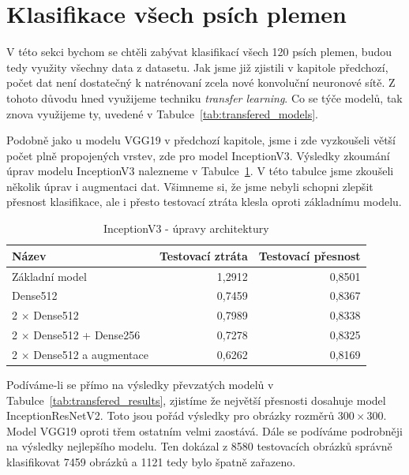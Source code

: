 \documentclass[a4paper,12pt]{article}
\begin{document}
\section{Klasifikace všech psích plemen}
V této sekci bychom se chtěli zabývat klasifikací všech 120 psích plemen, budou tedy využity všechny data z datasetu. Jak jsme již zjistili v kapitole předchozí, počet dat není dostatečný k natrénovaní zcela nové konvoluční neuronové sítě. Z tohoto důvodu hned využijeme techniku \emph{transfer learning}. Co se týče modelů, tak znova využijeme ty, uvedené v Tabulce~\ref{tab:transfered_models}.

Podobně jako u modelu VGG19 v předchozí kapitole, jsme i zde vyzkoušeli větší počet plně propojených vrstev, zde pro model InceptionV3. Výsledky zkoumání úprav modelu InceptionV3 nalezneme v Tabulce~\ref{tab:incv3tests}. V této tabulce jsme zkoušeli několik úprav i augmentaci dat. Všimneme si, že jsme nebyli schopni zlepšit přesnost klasifikace, ale i přesto testovací ztráta klesla oproti základnímu modelu.

\begin{table}[h!]
    \centering
    \begin{tabular}{l | r | r}
    \toprule
    Název                               & Testovací ztráta      & Testovací přesnost  \\\midrule
    Základní model                      & 1,2912                & 0,8501              \\
    Dense512                            & 0,7459                & 0,8367              \\
    2 $\times$ Dense512                 & 0,7989                & 0,8338              \\
    2 $\times$ Dense512 + Dense256      & 0,7278                & 0,8325              \\
    2 $\times$ Dense512 a augmentace    & 0,6262                & 0,8169              \\
    \bottomrule
    \end{tabular}
    \caption{InceptionV3 - úpravy architektury}
    \label{tab:incv3tests}
\end{table}

Podíváme-li se přímo na výsledky převzatých modelů v Tabulce~\ref{tab:transfered_results}, zjistíme že největší přesnosti dosahuje model InceptionResNetV2. Toto jsou pořád výsledky pro obrázky rozměrů $300 \times 300$. Model VGG19 oproti třem ostatním velmi zaostává. Dále se podíváme podrobněji na výsledky nejlepšího modelu. Ten dokázal z 8580 testovacích obrázků správně klasifikovat 7459 obrázků a 1121 tedy bylo špatně zařazeno.
\end{document}
